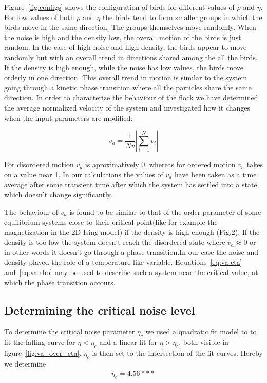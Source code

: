 \documentclass[twoside,twocolumn]{article}
\begin{document}
Figure~\ref{fig:configs} shows the configuration of birds for different values of $\rho$ and $\eta$.  
For low values of both $\rho$ and $\eta$ the birds tend to form smaller groups in which the birds move in the same direction.
The groups themselves move randomly.
When the noise is high and the density low, the overall motion of the birds is just random.
In the case of high noise and high density, the birds appear to move randomly but with an overall trend in directions
shared among the all the birds.
If the density is high enough, while the noise has low values, the birds move orderly in one direction.
This overall trend in motion is similar to the system going through a kinetic phase transition
where all the particles share the same direction. In order to characterize the behaviour of the flock
we have determined the average normalized velocity of the system and investigated how it changes when the input parameters are modified:

\begin{equation}
v_a=\frac{1}{Nv}\left\vert\sum_{i=1}^{N} v_i\right\vert
\end{equation}

For disordered motion $v_a$ is aproximatively 0, whereas for ordered motion $v_a$ takes on a value near 1.
In our calculations the values of $v_a$ have been taken as a time average after some transient time after which the system has settled into a state, which doesn't change significantly.


The behaviour of $v_a$ is found to be similar to that of the order parameter of some equilibrium systems close to their critical point(like for example the magnetization in the 2D Ising model) if the density is high enough (Fig.2).
If the density is too low the system doesn't reach the disordered state where $v_a\approx 0$ or in other words it doesn't go through a phase transition.In our case the noise and density played the role of a temperature-like variable. Equations~\eqref{eq:va-eta} and~\eqref{eq:va-rho} may be used to describe such a system near the critical value, at which the phase transition occours. 




\subsection*{Determining the critical noise level}
To determine the critical noise parameter $\eta_c$ we used a quadratic fit model
to to fit the falling curve for $\eta < \eta_c$ and a linear fit for $\eta > 
\eta_c$, both visible in figure~\ref{fig:va_over_eta}. $\eta_c$ is then set to 
the intersection of the fit curves. Hereby we determine
\begin{align}
\eta_c = 4.56***
\end{align}
\end{document}
